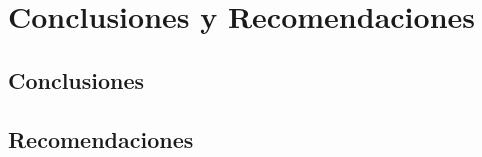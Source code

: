 \chapter{Conclusiones y Recomendaciones}

\section{Conclusiones}

\lipsum

\section{Recomendaciones}

\lipsum
